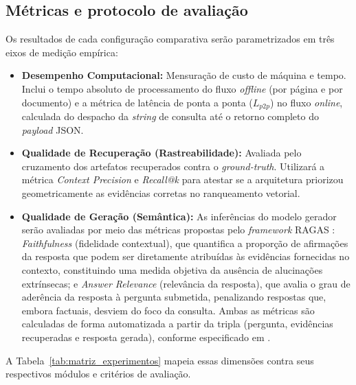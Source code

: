 \subsection{Métricas e protocolo de avaliação}
\label{subsec:metricas_protocolo}

Os resultados de cada configuração comparativa serão parametrizados em três eixos de medição empírica:
\begin{itemize}
    \item \textbf{Desempenho Computacional:} Mensuração de custo de máquina e tempo. Inclui o tempo absoluto de processamento do fluxo \textit{offline} (por página e por documento) e a métrica de latência de ponta a ponta ($L_{p2p}$) no fluxo \textit{online}, calculada do despacho da \textit{string} de consulta até o retorno completo do \textit{payload} JSON.
    \item \textbf{Qualidade de Recuperação (Rastreabilidade):} Avaliada pelo cruzamento dos artefatos recuperados contra o \textit{ground-truth}. Utilizará a métrica \textit{Context Precision} e \textit{Recall@k} para atestar se a arquitetura priorizou geometricamente as evidências corretas no ranqueamento vetorial.
    \item \textbf{Qualidade de Geração (Semântica):} As inferências do modelo gerador serão avaliadas por meio das métricas propostas pelo \textit{framework} RAGAS : \textit{Faithfulness} (fidelidade contextual), que quantifica a proporção de afirmações da resposta que podem ser diretamente atribuídas às evidências fornecidas no contexto, constituindo uma medida objetiva da ausência de alucinações extrínsecas; e \textit{Answer Relevance} (relevância da resposta), que avalia o grau de aderência da resposta à pergunta submetida, penalizando respostas que, embora factuais, desviem do foco da consulta. Ambas as métricas são calculadas de forma automatizada a partir da tripla (pergunta, evidências recuperadas e resposta gerada), conforme especificado em .

\end{itemize}

A Tabela~\ref{tab:matriz_experimentos} mapeia essas dimensões contra seus respectivos módulos e critérios de avaliação.

